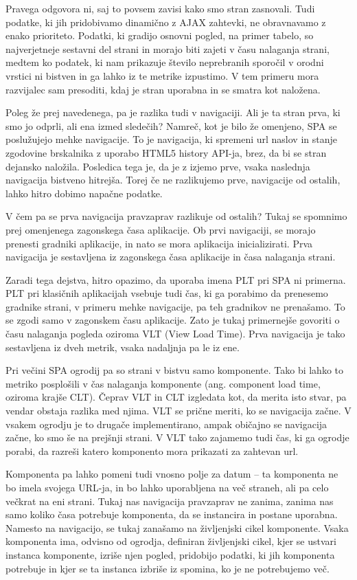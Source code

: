 \documentclass[a4paper, 12pt]{book}
\begin{document}
Pravega odgovora ni, saj to povsem zavisi kako smo stran zasnovali. Tudi podatke, ki jih pridobivamo dinamično z AJAX zahtevki, ne obravnavamo z enako prioriteto. Podatki, ki gradijo osnovni pogled, na primer tabelo, so najverjetneje sestavni del strani in morajo biti zajeti v času nalaganja strani, medtem ko podatek, ki nam prikazuje število neprebranih sporočil v orodni vrstici ni bistven in ga lahko iz te metrike izpustimo. V tem primeru mora razvijalec sam presoditi, kdaj je stran uporabna in se smatra kot naložena.

Poleg že prej navedenega, pa je razlika tudi v navigaciji. Ali je ta stran prva, ki smo jo odprli, ali ena izmed sledečih? Namreč, kot je bilo že omenjeno, SPA se poslužujejo mehke navigacije. To je navigacija, ki spremeni url naslov in stanje zgodovine brskalnika z uporabo HTML5 history API-ja, brez, da bi se stran dejansko naložila. Posledica tega je, da je z izjemo prve, vsaka naslednja navigacija bistveno hitrejša. Torej če ne razlikujemo prve,  navigacije od ostalih, lahko hitro dobimo napačne podatke.

V čem pa se prva navigacija pravzaprav razlikuje od ostalih? Tukaj se spomnimo prej omenjenega zagonskega časa aplikacije. Ob prvi navigaciji, se morajo prenesti gradniki aplikacije, in nato se mora aplikacija inicializirati. Prva navigacija je sestavljena iz zagonskega časa aplikacije in časa nalaganja strani.

Zaradi tega dejstva, hitro opazimo, da uporaba imena PLT pri SPA ni primerna. PLT pri klasičnih aplikacijah vsebuje tudi čas, ki ga porabimo da prenesemo gradnike strani, v primeru mehke navigacije, pa teh gradnikov ne prenašamo. To se zgodi samo v zagonskem času aplikacije. Zato je tukaj primernejše govoriti o času nalaganja pogleda oziroma VLT (View Load Time). Prva navigacija je tako sestavljena iz dveh metrik, vsaka nadaljnja pa le iz ene.

Pri večini SPA ogrodij pa so strani v bistvu samo komponente. Tako bi lahko to metriko posplošili v čas nalaganja komponente (ang. component load time, oziroma krajše CLT). Čeprav VLT in CLT izgledata kot, da merita isto stvar, pa vendar obstaja razlika med njima. VLT se prične meriti, ko se navigacija začne. V vsakem ogrodju je to drugače implementirano, ampak običajno se navigacija začne, ko smo še na prejšnji strani. V VLT tako zajamemo tudi čas, ki ga ogrodje porabi, da razreši katero komponento mora prikazati za zahtevan url.

Komponenta pa lahko pomeni tudi vnosno polje za datum -- ta komponenta ne bo imela svojega URL-ja, in bo lahko uporabljena na več straneh, ali pa celo večkrat na eni strani. Tukaj nas navigacija pravzaprav ne zanima, zanima nas samo koliko časa potrebuje komponenta, da se instancira in postane uporabna. Namesto na navigacijo, se tukaj zanašamo na življenjski cikel komponente. Vsaka komponenta ima, odvisno od ogrodja, definiran življenjski cikel, kjer se ustvari instanca komponente, izriše njen pogled, pridobijo podatki, ki jih komponenta potrebuje in kjer se ta instanca izbriše iz spomina, ko je ne potrebujemo več.
\end{document}
